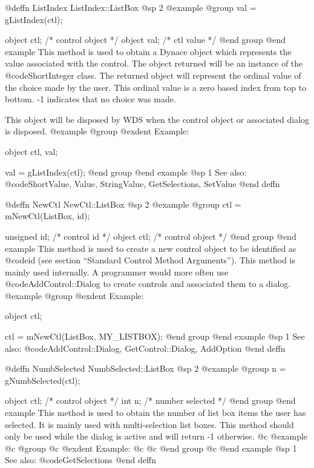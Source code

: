 @deffn {ListIndex} ListIndex::ListBox
@sp 2
@example
@group
val = gListIndex(ctl);

object  ctl;   /*  control object  */
object  val;   /*  ctl value       */
@end group
@end example
This method is used to obtain a Dynace object which represents the value
associated with the control.  The object returned will be an instance of
the @code{ShortInteger} class.  The returned object will represent the
ordinal value of the choice made by the user.  This ordinal value is a
zero based index from top to bottom.  -1 indicates that no choice was
made.

This object will be disposed by WDS when the control object or
associated dialog is disposed.
@example
@group
@exdent Example:

object  ctl, val;

val = gListIndex(ctl);
@end group
@end example
@sp 1
See also:  @code{ShortValue, Value, StringValue, GetSelections, SetValue}
@end deffn




@deffn {NewCtl} NewCtl::ListBox
@sp 2
@example
@group
ctl = mNewCtl(ListBox, id);

unsigned  id;   /*  control id      */
object   ctl;   /*  control object  */
@end group
@end example
This method is used to create a new control object to be identified as
@code{id} (see section ``Standard Control Method Arguments'').  This
method is mainly used internally.  A programmer would more often
use @code{AddControl::Dialog} to create controls and associated them
to a dialog.
@example
@group
@exdent Example:

object  ctl;

ctl = mNewCtl(ListBox, MY_LISTBOX);
@end group
@end example
@sp 1
See also:  @code{AddControl::Dialog, GetControl::Dialog, AddOption}
@end deffn











@deffn {NumbSelected} NumbSelected::ListBox
@sp 2
@example
@group
n = gNumbSelected(ctl);

object  ctl;    /*  control object   */
int     n;      /*  number selected  */
@end group
@end example
This method is used to obtain the number of list box items the user
has selected.  It is mainly used with multi-selection list boxes.
This method should only be used while the dialog is active and
will return -1 otherwise.
@c @example
@c @group
@c @exdent Example:
@c 
@c @end group
@c @end example
@sp 1
See also:  @code{GetSelections}
@end deffn














